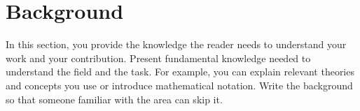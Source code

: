 \section{Background}
\label{sec:background}

In this section, you provide the knowledge the reader needs to understand your work and your contribution. Present fundamental knowledge needed to understand the field and the task. For example, you can explain relevant theories and concepts you use or introduce mathematical notation. Write the background so that someone familiar with the area can skip it. 